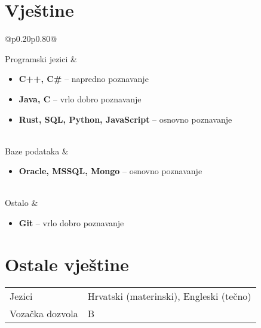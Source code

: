 \documentclass[a4paper]{article}
\makeatletter
\newlength{\tablewidth}
\newenvironment{skills}{%
\setlength{\tablewidth}{\linewidth}
\addtolength{\tablewidth}{-2\tabcolsep}
\begin{tabular}{@{}p{0.20\tablewidth}p{0.80\tablewidth}@{}}
}{%
\end{tabular}
}
\makeatother
\begin{document}
\section{Vje\v{s}tine}
\begin{skills}
	Programski jezici &
	\begin{itemize}
		\item \textbf{C++, C\#} -- napredno poznavanje
		\item \textbf{Java, C} -- vrlo dobro poznavanje
		\item \textbf{Rust, SQL, Python, JavaScript} -- osnovno poznavanje
	\end{itemize} \\
        Baze podataka &
        \begin{itemize}
                \item \textbf{Oracle, MSSQL, Mongo} -- osnovno poznavanje
        \end{itemize} \\
	Ostalo &
	\begin{itemize}
		\item \textbf{Git} -- vrlo dobro poznavanje
	\end{itemize}
\end{skills}

\section{Ostale vje\v{s}tine}
\begin{skills}
    Jezici & Hrvatski (materinski), Engleski (te\v{c}no) \\
    Voza\v{c}ka dozvola & B \\
\end{skills}
\end{document}
